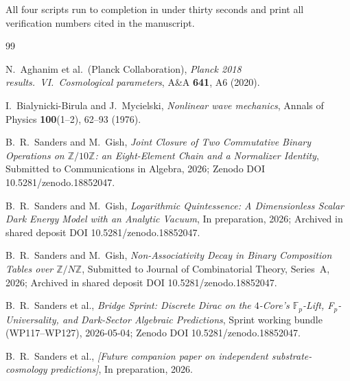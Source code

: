 \documentclass[11pt,reqno]{amsart}
\theoremstyle{plain}
\theoremstyle{definition}
\theoremstyle{remark}
\newcommand{\F}{\mathbb{F}}
\begin{document}
All four scripts run to completion in under thirty seconds and
print all verification numbers cited in the manuscript.

\begin{thebibliography}{99}

N.~Aghanim et al.\ (Planck Collaboration),
\emph{Planck 2018 results.\ VI.\ Cosmological parameters},
A\&A \textbf{641}, A6 (2020).

I.~Bialynicki-Birula and J.~Mycielski,
\emph{Nonlinear wave mechanics},
Annals of Physics \textbf{100}(1--2), 62--93 (1976).

B.~R.~Sanders and M.~Gish,
\emph{Joint Closure of Two Commutative Binary Operations on
$\mathbb{Z}/10\mathbb{Z}$: an Eight-Element Chain and a
Normalizer Identity},
Submitted to Communications in Algebra, 2026;
Zenodo DOI 10.5281/zenodo.18852047.

B.~R.~Sanders and M.~Gish,
\emph{Logarithmic Quintessence: A Dimensionless Scalar Dark
Energy Model with an Analytic Vacuum},
In preparation, 2026;
Archived in shared deposit DOI 10.5281/zenodo.18852047.

B.~R.~Sanders and M.~Gish,
\emph{Non-Associativity Decay in Binary Composition Tables over
$\mathbb{Z}/N\mathbb{Z}$},
Submitted to Journal of Combinatorial Theory, Series~A, 2026;
Archived in shared deposit DOI 10.5281/zenodo.18852047.

B.~R.~Sanders et al.,
\emph{Bridge Sprint: Discrete Dirac on the $4$-Core's
$\F_p$-Lift, F$_p$-Universality, and Dark-Sector Algebraic
Predictions},
Sprint working bundle (WP117--WP127), 2026-05-04;
Zenodo DOI 10.5281/zenodo.18852047.

B.~R.~Sanders et al.,
\emph{[Future companion paper on independent
substrate-cosmology predictions]},
In preparation, 2026.

\end{thebibliography}
\end{document}
